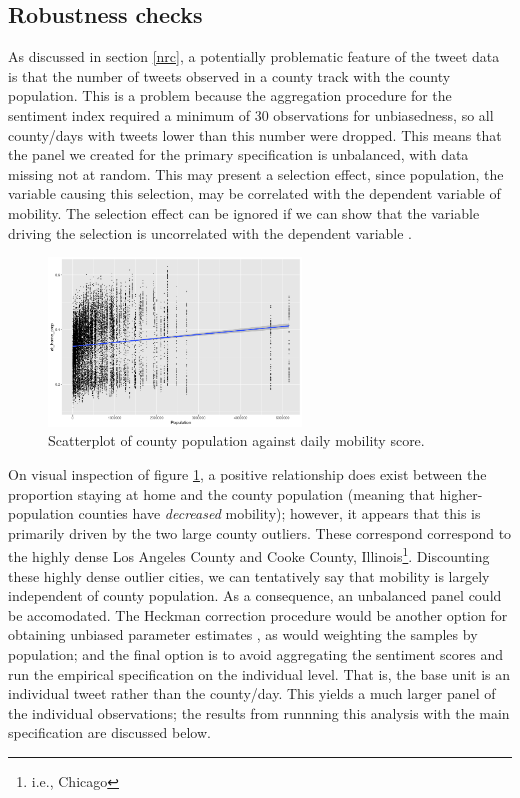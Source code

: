 \documentclass{article}
\begin{document}
\subsection{Robustness checks}\label{robust}
As discussed in section \ref{nrc}, a potentially problematic feature of the tweet data is that the number of tweets observed in a county track with the county population. This is a problem because the aggregation procedure for the sentiment index required a minimum of 30 observations for unbiasedness, so all county/days with tweets lower than this number were dropped. This means that the panel we created for the primary specification is unbalanced, with data missing not at random. This may present a selection effect, since population, the variable causing this selection, may be correlated with the dependent variable of mobility. The selection effect can be ignored if we can show that the variable driving the selection is uncorrelated with the dependent variable \parencite[552]{wooldridgeEconometricAnalysisCross2010}. 
\begin{figure}[!htb]
  \centering
  \caption{Scatterplot of county population against daily mobility score.}
  \label{popvsmobil}
  \includegraphics[width=0.6\textwidth]{figs/popvsmobil.png}
\end{figure}
On visual inspection of figure \ref{popvsmobil}, a positive relationship does exist between the proportion staying at home and the county population (meaning that higher-population counties have \textit{decreased} mobility); however, it appears that this is primarily driven by the two large county outliers. These correspond correspond to the highly dense Los Angeles County and Cooke County, Illinois\footnote{i.e., Chicago}. Discounting these highly dense outlier cities, we can tentatively say that mobility is largely independent of county population. As a consequence, an unbalanced panel could be accomodated. The Heckman correction procedure would be another option for obtaining unbiased parameter estimates \parencite{wooldridgeSelectionCorrectionsPanel1995}, as would weighting the samples by population; and the final option is to avoid aggregating the sentiment scores and run the empirical specification on the individual level. That is, the base unit is an individual tweet rather than the county/day. This yields a much larger panel of the individual observations; the results from runnning this analysis with the main specification are discussed below.
\end{document}
